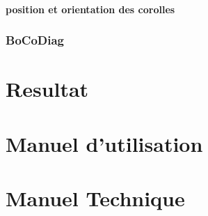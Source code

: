 \documentclass{article}
\begin{document}
	\paragraph{position et orientation des corolles}

	\subsubsection{BoCoDiag}
	
	\section{Resultat}
	
	\section{Manuel d'utilisation}
	
	\section{Manuel Technique}
\end{document}
